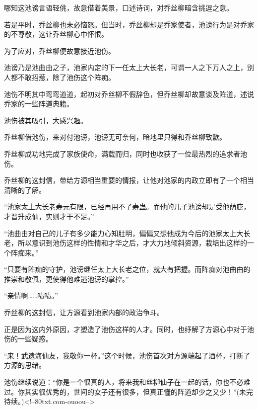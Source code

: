 \begin{this_body}
哪知这池谤言语轻佻，故意借着美景，口述诗词，对乔丝柳暗含挑逗之意。

若是平时，乔丝柳也未必恼怒。但当时，乔丝柳却是乔家使者，池谤行为是对乔家的不尊敬，这让乔丝柳心中怀恨。

为了应对，乔丝柳便故意接近池伤。

池谤乃是池曲由之子，池家内定的下一任太上大长老，可谓一人之下万人之上，别人都不敢招惹，除了池伤这个阵痴。

池伤不明其中弯弯道道，起初对乔丝柳不假辞色，但乔丝柳却故意谈及阵道，述说乔家的一些阵道典籍。

池伤被其吸引，大感兴趣。

乔丝柳借池伤，来对付池谤，池谤无可奈何，暗地里只得和乔丝柳致歉。

乔丝柳成功地完成了家族使命，满载而归，同时也收获了一位最热烈的追求者池伤。

乔丝柳的这封信，带给方源相当重要的情报，让他对池家的内政立即有了一个相当清晰的了解。

“池家太上大长老寿元有限，已经再用不了寿蛊。而他的儿子池谤却是受他荫庇，才晋升成仙，实则才干不足。”

“池曲由对自己的儿子有多少能力心知肚明，偏偏又想他成为今后的池家太上大长老，所以意识到池伤这样的性情和才华之后，才大力地倾斜资源，栽培出这样的一个阵痴来。”

“只要有阵痴的守护，池谤继任太上大长老之位，就大有把握。而阵痴对池曲由的推崇和敬佩，更使得他难逃池谤的掌控。”

“亲情啊……啧啧。”

乔丝柳的这封信，让方源看到池家内部的政治争斗。

正是因为这内外原因，才塑造了池伤这样的人才。同时，也纾解了方源心中对于池伤的一些疑惑。

“来！武遗海仙友，我敬你一杯。”这个时候，池伤首次对方源端起了酒杯，打断了方源的思绪。

池伤继续说道：“你是一个很真的人，将来我和丝柳仙子在一起的话，你也不必难过。你其实很优秀的，世间的女子还有很多，但真正懂的阵道却少之又少！”(未完待续。)<!--80txt.com-ouoou-->

\end{this_body}

